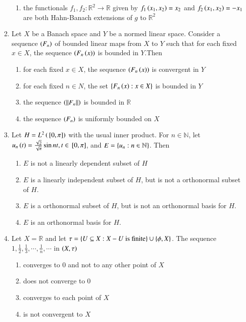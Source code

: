\documentclass[journal]{IEEEtran}
\begin{document}
\begin{enumerate}
{\begin{enumerate}
\item the functionals $f_1,f_2:\mathbb{R}^2\rightarrow\mathbb{R}$ given by $f_1\left(x_1,x_2\right)=x_2$ and $f_2\left(x_1,x_2\right)=-x_1$ are both Hahn-Banach extensions of $g$ to $\mathbb{R}^2$ 
\end{enumerate}
}
\item{
Let $X$ be a Banach space and $Y$ be a normed linear space. Consider a sequence $\left(F_n\right)$ of bounded linear maps from $X$ to $Y$ such that for each fixed $x\in X$, the sequence $\left(F_n\left(x\right)\right)$ is bounded in $Y$.Then
\begin{enumerate}
\item for each fixed $x\in X$, the sequence $\left(F_n\left(x\right)\right)$ is convergent in $Y$
\item for each fixed $n\in N$, the set $\left\{F_n\left(x\right):x\in X\right\}$ is bounded in $Y$
\item the sequence $\left(\left\lVert F_n\right\rVert\right)$ is bounded in $\mathbb{R}$
\item the sequence $\left(F_n\right)$ is uniformly bounded on $X$
\end{enumerate}
}
\item{
Let $H=L^2\left({}\left[0,\pi\right]\right)$ with the usual inner product. For $n\in \mathbb{N}$, let $u_n\left(t\right)=\frac{\sqrt{2}}{\sqrt{\pi}}\sin nt,t\in{}\left[0,\pi\right]$, and $E=\left\{u_n:n\in\mathbb{N}\right\}$. Then
\begin{enumerate}
\item $E$ is not a linearly dependent subset of $H$
\item $E$ is a linearly independent subset of $H$, but is not a orthonormal subset of $H$.
\item $E$ is a orthonormal subset of $H$, but is not an orthonormal basis for $H$.
\item $E$ is an orthonormal basis for $H$.
\end{enumerate}
}
\item{
Let $X=\mathbb{R}$ and let $\tau=\left\{U\subseteq X:X-U\text{ is finite}\right\}\cup\left\{\phi,X\right\}$. The sequence $1,\frac{1}{2},\frac{1}{3},\cdots,\frac{1}{n},\cdots$ in $\left(X,\tau\right)$
\begin{multicols}{2}
\begin{enumerate}
\item converges to $0$ and not to any other point of $X$
\item does not converge to $0$
\item converges to each point of $X$  
\item is not convergent to $X$
\end{enumerate}

\end{multicols}}
\end{enumerate}
\end{document}
